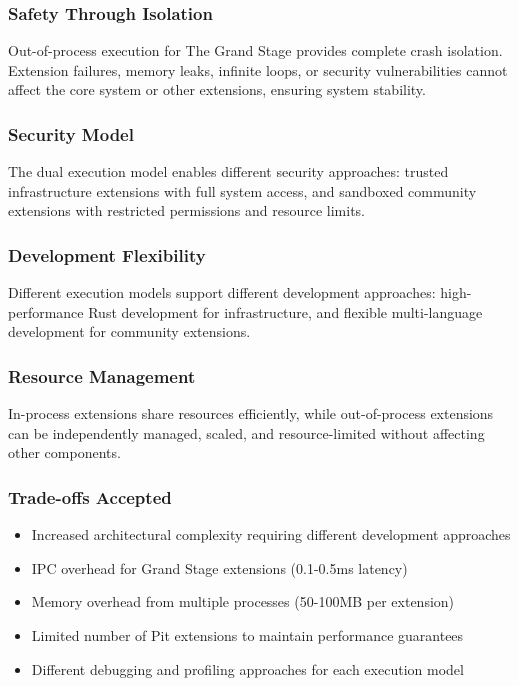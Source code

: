 \subsubsection*{Safety Through Isolation}
Out-of-process execution for The Grand Stage provides complete crash isolation. Extension failures, memory leaks, infinite loops, or security vulnerabilities cannot affect the core system or other extensions, ensuring system stability.

\subsubsection*{Security Model}
The dual execution model enables different security approaches: trusted infrastructure extensions with full system access, and sandboxed community extensions with restricted permissions and resource limits.

\subsubsection*{Development Flexibility}
Different execution models support different development approaches: high-performance Rust development for infrastructure, and flexible multi-language development for community extensions.

\subsubsection*{Resource Management}
In-process extensions share resources efficiently, while out-of-process extensions can be independently managed, scaled, and resource-limited without affecting other components.

\subsubsection*{Trade-offs Accepted}
\begin{itemize}
\item Increased architectural complexity requiring different development approaches
\item IPC overhead for Grand Stage extensions (0.1-0.5ms latency)
\item Memory overhead from multiple processes (50-100MB per extension)
\item Limited number of Pit extensions to maintain performance guarantees
\item Different debugging and profiling approaches for each execution model
\end{itemize}


